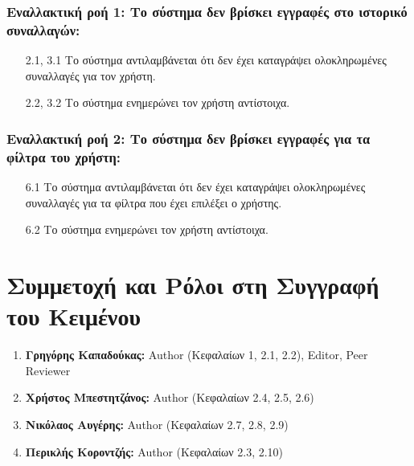 \documentclass[12pt,a4paper]{article}
\begin{document}
\subsubsection*{Εναλλακτική ροή 1: Το σύστημα δεν βρίσκει εγγραφές στο ιστορικό συναλλαγών:}
\begin{enumerate}
    \item [2.1, 3.1] Το σύστημα αντιλαμβάνεται ότι δεν έχει καταγράψει ολοκληρωμένες συναλλαγές για τον χρήστη.
    \item [2.2, 3.2] Το σύστημα ενημερώνει τον χρήστη αντίστοιχα.
\end{enumerate}

\subsubsection*{Εναλλακτική ροή 2: Το σύστημα δεν βρίσκει εγγραφές για τα φίλτρα του χρήστη:}
\begin{enumerate}
    \item [6.1] Το σύστημα αντιλαμβάνεται ότι δεν έχει καταγράψει ολοκληρωμένες συναλλαγές για τα φίλτρα που έχει επιλέξει ο χρήστης.
    \item [6.2] Το σύστημα ενημερώνει τον χρήστη αντίστοιχα.
\end{enumerate}

\section{Συμμετοχή και Ρόλοι στη Συγγραφή του Κειμένου}
\begin{enumerate}
	\item \textbf{Γρηγόρης Καπαδούκας:} Author (Κεφαλαίων 1, 2.1, 2.2), Editor, Peer Reviewer
	\item \textbf{Χρήστος Μπεστητζάνος:} Author (Κεφαλαίων 2.4, 2.5, 2.6)
   	\item \textbf{Νικόλαος Αυγέρης:} Author (Κεφαλαίων 2.7, 2.8, 2.9)
	\item \textbf{Περικλής Κοροντζής:} Author (Κεφαλαίων 2.3, 2.10)
\end{enumerate}
\end{document}
